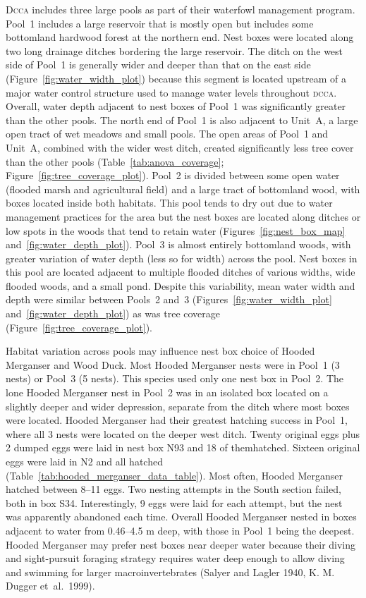 
D\textsc{cca} includes three large pools as part of their waterfowl management program. Pool~1 includes a large reservoir that is mostly open but includes some bottomland hardwood forest at the northern end. Nest boxes were located along two long drainage ditches bordering the large reservoir. The ditch on the west side of Pool~1 is generally wider and deeper than that on the east side (Figure~\ref{fig:water_width_plot}) because this segment is located upstream of a major water control structure used to manage water levels throughout \textsc{dcca}. Overall, water depth adjacent to nest boxes of Pool~1 was significantly greater than the other pools. The north end of Pool~1 is also adjacent to Unit~A, a large open tract of wet meadows and small pools. The open areas of Pool~1 and Unit~A, combined with the wider west ditch, created significantly less tree cover than the other pools (Table~\ref{tab:anova_coverage}; Figure~\ref{fig:tree_coverage_plot}). Pool~2 is divided between some open water (flooded marsh and agricultural field) and a large tract of bottomland wood, with boxes located inside both habitats.  This pool tends to dry out due to water management practices for the area but the nest boxes are located along ditches or low spots in the woods that tend to retain water (Figures~\ref{fig:nest_box_map} and~\ref{fig:water_depth_plot}).  Pool~3 is almost entirely bottomland woods, with greater variation of water depth (less so for width) across the pool. Nest boxes in this pool are located adjacent to multiple flooded ditches of various widths, wide flooded woods, and a small pond. Despite this variability, mean water width and depth were similar between Pools~2 and~3 (Figures~\ref{fig:water_width_plot} and~\ref{fig:water_depth_plot}) as was tree coverage (Figure~\ref{fig:tree_coverage_plot}). 

Habitat variation across pools may influence nest box choice of Hooded Merganser and Wood Duck. Most Hooded Merganser nests were in Pool~1 (3 nests) or Pool~3 (5 nests). This species used only one nest box in Pool~2. The lone Hooded Merganser nest in Pool~2 was in an isolated box located on a slightly deeper and wider depression, separate from the ditch where most boxes were located. Hooded Merganser had their greatest hatching success in Pool~1, where all 3 nests were located on the deeper west ditch. Twenty original eggs plus 2 dumped eggs were laid in nest box N93 and 18 of themhatched.  Sixteen original eggs were laid in N2 and all hatched (Table~\ref{tab:hooded_merganser_data_table}).  Most often, Hooded Merganser hatched between 8–11 eggs. Two nesting attempts in the South section failed, both in box S34. Interestingly, 9 eggs were laid for each attempt, but the nest was apparently abandoned each time. Overall Hooded Merganser nested in boxes adjacent to water from 0.46–4.5 m deep, with those in Pool~1 being the deepest. Hooded Merganser may prefer nest boxes near deeper water because their diving and sight-pursuit foraging strategy requires water deep enough to allow diving and swimming for larger macroinvertebrates (Salyer and Lagler 1940, K. M. Dugger et~al.~1999).  

